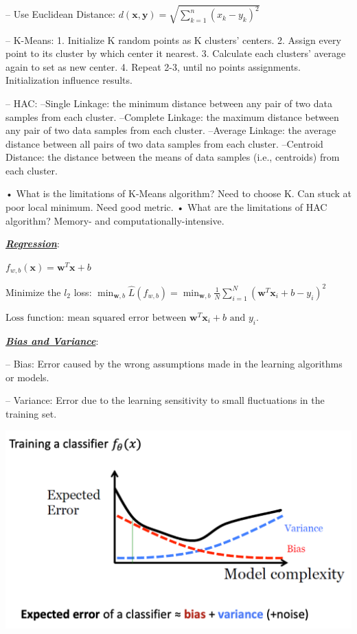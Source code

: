 \documentclass[12pt]{article}
\newcommand{\bulletPoint}[1]{\ul{\textit{\textbf{#1}}}}
\begin{document}
\begin{multicols*}{2}
– Use Euclidean Distance: $d(\mathbf{x}, \mathbf{y}) = \sqrt{\sum_{k=1}^n (x_k - y_k)^2}$

– K-Means: 1. Initialize K random points as K clusters' centers. 2. Assign every point to its cluster by which center it nearest. 3. Calculate each clusters' average again to set as new center. 4. Repeat 2-3, until no points assignments.    Initialization influence results. 

– HAC: 
--Single Linkage: the minimum distance between any pair of two data samples from each cluster. 
 --Complete Linkage: the maximum distance between any pair of two data samples from each cluster. 
 --Average Linkage: the average distance between all pairs of two data samples from each cluster.    
 --Centroid Distance: the distance between the means of data samples (i.e., centroids) from each cluster.

• What is the limitations of K-Means algorithm?
Need to choose K. Can stuck at poor local minimum. Need good metric.
• What are the limitations of HAC algorithm?
Memory- and computationally-intensive.

\bulletPoint{Regression}:

$ f_{w,b}(\mathbf{x}) = \mathbf{w}^T \mathbf{x} + b $

Minimize the \( l_2 \) loss: $ \min_{\mathbf{w}, b} \hat{L}(f_{w,b}) = \min_{\mathbf{w}, b} \frac{1}{N} \sum_{i=1}^N \left( \mathbf{w}^T \mathbf{x}_i + b - y_i \right)^2 $

$ \text{Loss function: mean squared error between } \mathbf{w}^T \mathbf{x}_i + b \text{ and } y_i. $


\bulletPoint{Bias and Variance}:

– Bias: Error caused by the wrong assumptions made in the learning algorithms or models.

– Variance: Error due to the learning sensitivity to small fluctuations in the training set.

\includegraphics[scale=0.27]{images/bias & variance.png}


\end{multicols*}
\end{document}
